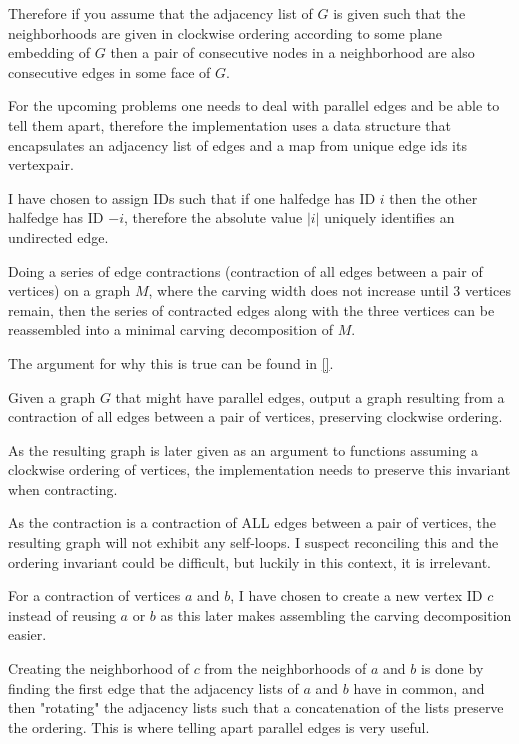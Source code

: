 \documentclass{article}
\begin{document}
	Therefore if you assume that the adjacency list of $G$ is given such that the neighborhoods are given in clockwise ordering according to some plane embedding of $G$ then a pair of consecutive nodes in a neighborhood are also consecutive edges in some face of $G$.


	For the upcoming problems one needs to deal with parallel edges and be able to tell them apart, therefore the implementation uses a data structure that encapsulates an adjacency list of edges and a map from unique edge ids its vertexpair.

	I have chosen to assign IDs such that if one halfedge has ID $i$ then the other halfedge has ID $-i$, therefore the absolute value $|i|$ uniquely identifies an undirected edge.


	Doing a series of edge contractions (contraction of all edges between a pair of vertices) on a graph $M$, where the carving width does not increase until 3 vertices remain, then the series of contracted edges along with the three vertices can be reassembled into a minimal carving decomposition of $M$.

	The argument for why this is true can be found in \ref{}.

	\begin{problem}
		Given a graph $G$ that might have parallel edges, output a graph resulting from a contraction of all edges between a pair of vertices, preserving clockwise ordering.
	\end{problem}

	As the resulting graph is later given as an argument to functions assuming a clockwise ordering of vertices, the implementation needs to preserve this invariant when contracting.

	As the contraction is a contraction of ALL edges between a pair of vertices, the resulting graph will not exhibit any self-loops. I suspect reconciling this and the ordering invariant could be difficult, but luckily in this context, it is irrelevant.

	For a contraction of vertices $a$ and $b$, I have chosen to create a new vertex ID $c$ instead of reusing $a$ or $b$ as this later makes assembling the carving decomposition easier.

	Creating the neighborhood of $c$ from the neighborhoods of $a$ and $b$ is done by finding the first edge that the adjacency lists of $a$ and $b$ have in common, and then "rotating" the adjacency lists such that a concatenation of the lists preserve the ordering. This is where telling apart parallel edges is very useful.
\end{document}

